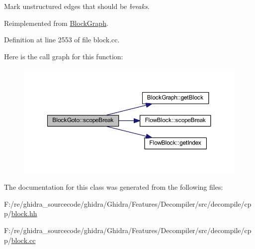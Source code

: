Mark unstructured edges that should be {\itshape breaks}. 



Reimplemented from \mbox{\hyperlink{class_block_graph_a55618dfd49266bd4185d119f08e8b630}{Block\+Graph}}.



Definition at line 2553 of file block.\+cc.

Here is the call graph for this function\+:
\nopagebreak
\begin{figure}[H]
\begin{center}
\leavevmode
\includegraphics[width=350pt]{class_block_goto_ad409112a4ad46f076a923bd152428a83_cgraph}
\end{center}
\end{figure}


The documentation for this class was generated from the following files\+:\begin{DoxyCompactItemize}
\item 
F\+:/re/ghidra\+\_\+sourcecode/ghidra/\+Ghidra/\+Features/\+Decompiler/src/decompile/cpp/\mbox{\hyperlink{block_8hh}{block.\+hh}}\item 
F\+:/re/ghidra\+\_\+sourcecode/ghidra/\+Ghidra/\+Features/\+Decompiler/src/decompile/cpp/\mbox{\hyperlink{block_8cc}{block.\+cc}}\end{DoxyCompactItemize}
